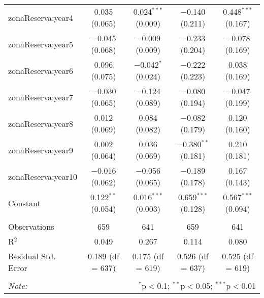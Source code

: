 \begin{table}[!htbp]
\begin{tabular}{@{\extracolsep{1pt}}lcccc}
  zonaReserva:year4 & 0.035 (0.065) & 0.024$^{***}$ (0.009) & $-$0.140 (0.211) & 0.448$^{***}$ (0.167) \\ 
  zonaReserva:year5 & $-$0.045 (0.068) & $-$0.009 (0.009) & $-$0.233 (0.204) & $-$0.078 (0.169) \\ 
  zonaReserva:year6 & 0.096 (0.075) & $-$0.042$^{*}$ (0.024) & $-$0.222 (0.223) & 0.038 (0.169) \\ 
  zonaReserva:year7 & $-$0.030 (0.065) & $-$0.124 (0.089) & $-$0.080 (0.194) & $-$0.047 (0.199) \\ 
  zonaReserva:year8 & 0.012 (0.069) & 0.084 (0.082) & $-$0.082 (0.179) & 0.120 (0.160) \\ 
  zonaReserva:year9 & 0.002 (0.064) & 0.036 (0.069) & $-$0.380$^{**}$ (0.181) & 0.210 (0.181) \\ 
  zonaReserva:year10 & $-$0.016 (0.062) & $-$0.056 (0.065) & $-$0.189 (0.178) & 0.167 (0.143) \\ 
  Constant & 0.122$^{**}$ (0.054) & 0.016$^{***}$ (0.003) & 0.659$^{***}$ (0.128) & 0.567$^{***}$ (0.094) \\ 
 \hline \\[-1.8ex] 
Observations & 659 & 641 & 659 & 641 \\ 
R$^{2}$ & 0.049 & 0.267 & 0.114 & 0.080 \\ 
Residual Std. Error & 0.189 (df = 637) & 0.175 (df = 619) & 0.526 (df = 637) & 0.525 (df = 619) \\ 
\hline 
\hline \\[-1.8ex] 
\textit{Note:}  & \multicolumn{4}{r}{$^{*}$p$<$0.1; $^{**}$p$<$0.05; $^{***}$p$<$0.01} \\ 
\end{tabular} 
\end{table} 
